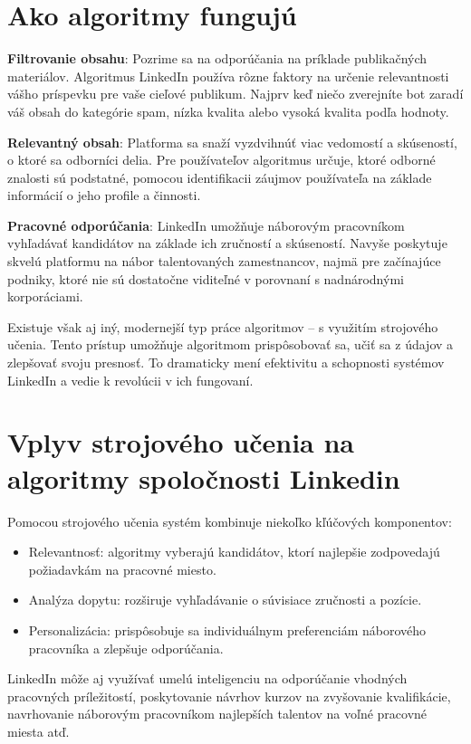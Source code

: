 \documentclass[slovak,a4paper]{coursepaper}
\begin{document}
\section{Ako algoritmy fungujú} \label{fungovanie}
\textbf{Filtrovanie obsahu}: Pozrime sa na odporúčania na príklade publikačných materiálov. Algoritmus LinkedIn používa rôzne faktory na určenie relevantnosti vášho príspevku pre vaše cieľové publikum. Najprv keď niečo zverejníte bot zaradí váš obsah do kategórie spam, nízka kvalita alebo vysoká kvalita podľa hodnoty. ~\cite{Terez:article}

\textbf{Relevantný obsah}: Platforma sa snaží vyzdvihnúť viac vedomostí a skúseností, o ktoré sa odborníci delia. Pre používateľov algoritmus určuje, ktoré odborné znalosti sú podstatné, pomocou identifikacii záujmov používateľa na základe informácií o jeho profile a činnosti.~\cite{Barnhart:article}

\textbf{Pracovné odporúčania}: LinkedIn umožňuje náborovým pracovníkom vyhľadávať kandidátov na základe ich zručností a skúseností. Navyše poskytuje skvelú platformu na nábor talentovaných zamestnancov, najmä pre začínajúce podniky, ktoré nie sú dostatočne viditeľné v porovnaní s nadnárodnými korporáciami.~\cite{Rodriguez:article}

Existuje však aj iný, modernejší typ práce algoritmov – s využitím strojového učenia. Tento prístup umožňuje algoritmom prispôsobovať sa, učiť sa z údajov a zlepšovať svoju presnosť. To dramaticky mení efektivitu a schopnosti systémov LinkedIn a vedie k revolúcii v ich fungovaní.

\section{Vplyv strojového učenia na algoritmy spoločnosti Linkedin} \label{strojové učenie}
Pomocou strojového učenia systém kombinuje niekoľko kľúčových komponentov:
\begin{itemize}
	\item Relevantnosť: algoritmy vyberajú kandidátov, ktorí najlepšie zodpovedajú požiadavkám na pracovné miesto.
	\item Analýza dopytu: rozširuje vyhľadávanie o súvisiace zručnosti a pozície.
	\item Personalizácia: prispôsobuje sa individuálnym preferenciám náborového pracovníka a zlepšuje odporúčania.
\end{itemize}

LinkedIn môže aj využívať umelú inteligenciu na odporúčanie vhodných pracovných príležitostí, poskytovanie návrhov kurzov na zvyšovanie kvalifikácie, navrhovanie náborovým pracovníkom najlepších talentov na voľné pracovné miesta atď.~\cite{Mangla:article}
\end{document}
